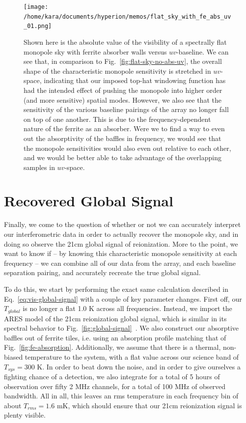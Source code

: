 \begin{figure}
    \begin{center}
    \texttt{[image: /home/kara/documents/hyperion/memos/flat\_sky\_with\_fe\_abs\_uv\_01.png]}
    \end{center}
    \caption{
        Shown here is the absolute value of the visibility of a spectrally flat 
        monopole sky with ferrite absorber walls versus $uv$-baseline. We can 
        see that, in comparison to Fig.~\ref{fig:flat-sky-no-abs-uv}, the 
        overall shape of the characteristic monopole sensitivity is stretched 
        in $uv$-space, indicating that our imposed top-hat windowing function 
        has had the intended effect of pushing the monopole into higher order 
        (and more sensitive) spatial modes. However, we also see that the 
        sensitivity of the various baseline pairings of the array no longer 
        fall on top of one another. This is due to the frequency-dependent 
        nature of the ferrite as an absorber. Were we to find a way to even out 
        the absorptivity of the baffles in frequency, we would see that the 
        monopole sensitivities would also even out relative to each other, and 
        we would be better able to take advantage of the overlapping samples in 
        $uv$-space.
    }
    \label{fig:flat-sky-fe-abs-uv}
\end{figure}

\section{Recovered Global Signal}
\label{sec:recovered-signal}

Finally, we come to the question of whether or not we can accurately interpret 
our interferometric data in order to actually recover the monopole sky, and in 
doing so observe the 21cm global signal of reionization. More to the point, we 
want to know if -- by knowing this characteristic monopole sensitivity at each 
frequency -- we can combine all of our data from the array, and each baseline 
separation pairing, and accurately recreate the true global signal.

To do this, we start by performing the exact same calculation described in 
Eq.~\eqref{eq:vis-global-signal} with a couple of key parameter changes. First 
off, our $T_{global}$ is no longer a flat 1.0 K across all frequencies.  
Instead, we import the ARES model of the 21cm reionization global signal, which 
is similar in its spectral behavior to 
Fig.~\ref{fig:global-signal}~\citep{mirocha2014}. We also construct our 
absorptive baffles out of ferrite tiles, i.e. using an absorption profile 
matching that of Fig.~\ref{fig:fe-absorption}. Additionally, we assume that 
there is a thermal, non-biased temperature to the system, with a flat value 
across our science band of $T_{sys} = 300$ K.  In order to beat down the noise, 
and in order to give ourselves a fighting chance of a detection, we also 
integrate for a total of 5 hours of observation over fifty 2 MHz channels, for 
a total of 100 MHz of observed bandwidth. All in all, this leaves an rms 
temperature in each frequency bin of about $T_{rms} = 1.6$ mK, which should 
ensure that our 21cm reionization signal is plenty visible. 

